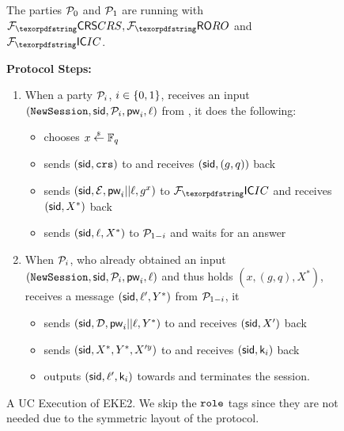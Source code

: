 \begin{figure}[htbp]
  \centering
  \begin{fboxenv}
    \begin{minipage}{0.95\textwidth}
      The parties $\mathcal{P}_{0}$ and $\mathcal{P}_{1}$ are running with $\Fcrs, \Fro$ and $\Fic$. 
      
      \textbf{Protocol Steps:}
      \begin{enumerate}
      \item
        When a party $\mathcal{P}_{i}$, $i\in\{0,1\}$, receives an input $(\texttt{NewSession},\mathsf{sid},\mathcal{P}_{i},\mathsf{pw}_{i},\ell)$ from \Env, it does the following:
          \begin{itemize}
           \item chooses $x\stackrel{{}_\$}{\leftarrow}\mathbb{F}_q$
           \item sends $(\mathsf{sid},\texttt{crs})$ to \Fcrs and receives $(\mathsf{sid},(g,q))$ back
           \item sends $(\mathsf{sid},\mathcal{E},\mathsf{pw}_{i}||\ell,g^x)$ to $\Fic$ and receives $(\mathsf{sid},X^*)$ back
           \item sends $(\mathsf{sid},\ell,X^*)$ to $\mathcal{P}_{1-i}$ and waits for an answer
          \end{itemize}
      \item 
        When $\mathcal{P}_{i}$, who already obtained an input $(\texttt{NewSession},\mathsf{sid},\mathcal{P}_{i},\mathsf{pw}_{i},\ell)$ and thus holds $(x,(g,q),X^*)$, receives a message $(\mathsf{sid},\ell',Y^*)$ from $\mathcal{P}_{1-i}$, it 
        \begin{itemize}
         \item sends $(\mathsf{sid},\mathcal{D},\mathsf{pw}_{i}||\ell,Y^*)$ to \Fic and receives $(\mathsf{sid},X')$ back
         \item sends $(\mathsf{sid},X^*,Y^*,X'^y)$ to \Fro and receives $(\mathsf{sid},\mathsf{k}_{i})$ back
         \item outputs $(\mathsf{sid},\ell',\mathsf{k}_{i})$ towards \Env and terminates the session.
        \end{itemize}
      \end{enumerate}
    \end{minipage}
  \end{fboxenv}
  \caption{A UC Execution of EKE2. We skip the $\texttt{role}$ tags since they are not needed due to the symmetric layout of the protocol.}\label{fig:UC-EKE2}
\end{figure}

